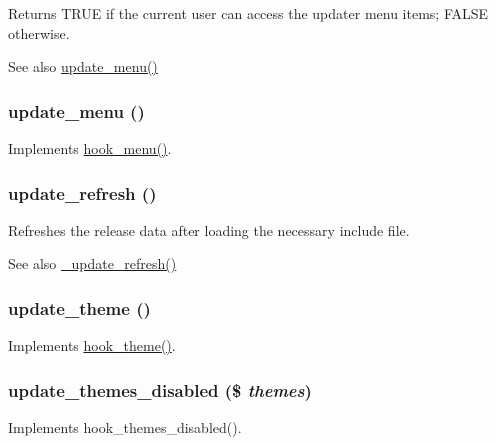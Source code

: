 \begin{DoxyReturn}{Returns}
TRUE if the current user can access the updater menu items; FALSE otherwise.
\end{DoxyReturn}
\begin{DoxySeeAlso}{See also}
\hyperlink{update_8module_abfea1a759334c0461fa9ff2250bdfaaf}{update\_\-menu()} 
\end{DoxySeeAlso}
\hypertarget{update_8module_abfea1a759334c0461fa9ff2250bdfaaf}{
\subsubsection[{update\_\-menu}]{\setlength{\rightskip}{0pt plus 5cm}update\_\-menu ()}}
\label{update_8module_abfea1a759334c0461fa9ff2250bdfaaf}
Implements \hyperlink{group__hooks_ga5c95244fea59b25666e409759e133ded}{hook\_\-menu()}. \hypertarget{update_8module_a601f9ec9c404ec41711b00884e7d0573}{
\subsubsection[{update\_\-refresh}]{\setlength{\rightskip}{0pt plus 5cm}update\_\-refresh ()}}
\label{update_8module_a601f9ec9c404ec41711b00884e7d0573}
Refreshes the release data after loading the necessary include file.

\begin{DoxySeeAlso}{See also}
\hyperlink{update_8fetch_8inc_aa9814236d331f2e6822435215e9acd8e}{\_\-update\_\-refresh()} 
\end{DoxySeeAlso}
\hypertarget{update_8module_a6146aad98ab9ceb29de1d9fe71161b15}{
\subsubsection[{update\_\-theme}]{\setlength{\rightskip}{0pt plus 5cm}update\_\-theme ()}}
\label{update_8module_a6146aad98ab9ceb29de1d9fe71161b15}
Implements \hyperlink{group__hooks_ga013ccb45c7aaab1c16cf9691428c910d}{hook\_\-theme()}. \hypertarget{update_8module_ace87a8222bcba4e44e36395e081bd41a}{
\subsubsection[{update\_\-themes\_\-disabled}]{\setlength{\rightskip}{0pt plus 5cm}update\_\-themes\_\-disabled (\$ {\em themes})}}
\label{update_8module_ace87a8222bcba4e44e36395e081bd41a}
Implements hook\_\-themes\_\-disabled().

